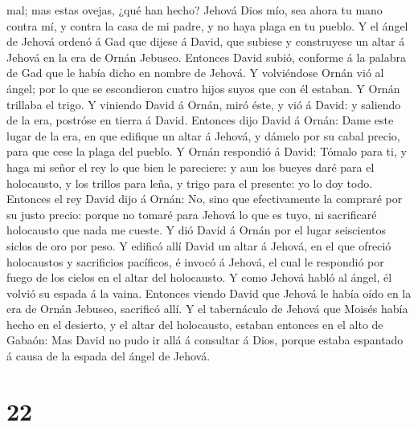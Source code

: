 mal; mas estas ovejas, ¿qué han hecho? Jehová Dios mío, sea ahora tu
mano contra mí, y contra la casa de mi padre, y no haya plaga en tu
pueblo.  Y el ángel de Jehová ordenó á Gad que dijese á
David, que subiese y construyese un altar á Jehová en la era de Ornán
Jebuseo.  Entonces David subió, conforme á la palabra de
Gad que le había dicho en nombre de Jehová.  Y volviéndose
Ornán vió al ángel; por lo que se escondieron cuatro hijos suyos que con
él estaban. Y Ornán trillaba el trigo.  Y viniendo David á
Ornán, miró éste, y vió á David: y saliendo de la era, postróse en
tierra á David.  Entonces dijo David á Ornán: Dame este
lugar de la era, en que edifique un altar á Jehová, y dámelo por su
cabal precio, para que cese la plaga del pueblo.  Y Ornán
respondió á David: Tómalo para ti, y haga mi señor el rey lo que bien le
pareciere: y aun los bueyes daré para el holocausto, y los trillos para
leña, y trigo para el presente: yo lo doy todo.  Entonces
el rey David dijo á Ornán: No, sino que efectivamente la compraré por su
justo precio: porque no tomaré para Jehová lo que es tuyo, ni
sacrificaré holocausto que nada me cueste.  Y dió David á
Ornán por el lugar seiscientos siclos de oro por peso.  Y
edificó allí David un altar á Jehová, en el que ofreció holocaustos y
sacrificios pacíficos, é invocó á Jehová, el cual le respondió por fuego
de los cielos en el altar del holocausto.  Y como Jehová
habló al ángel, él volvió su espada á la vaina.  Entonces
viendo David que Jehová le había oído en la era de Ornán Jebuseo,
sacrificó allí.  Y el tabernáculo de Jehová que Moisés
había hecho en el desierto, y el altar del holocausto, estaban entonces
en el alto de Gabaón: Mas David no pudo ir allá á consultar á Dios,
porque estaba espantado á causa de la espada del ángel de Jehová.

\hypertarget{section-21}{%
\section{22}\label{section-21}}

